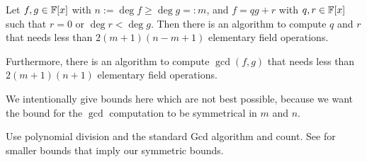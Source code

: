 


\begin{Prop}
\label{standardgcd}

Let $f,g \in \mathbb{F}[x]$ with $n := \deg f \ge \deg g =: m$, and $f = qg + r$
with $q,r \in \mathbb{F}[x]$ such that $r=0$ or $\deg r < \deg g$. Then there is an
algorithm to compute $q$ and $r$ that needs less than $2(m+1)(n-m+1)$ 
elementary field operations. 

Furthermore, there is an
algorithm to compute $\gcd(f,g)$ that needs less than
$2(m+1)(n+1)$ elementary field operations.
\end{Prop}

\begin{Rem}{We intentionally give bounds here which are not best possible,
because we want the bound for the $\gcd$ computation to be symmetrical in
$m$ and $n$.}
\end{Rem}

Use polynomial division and the standard {\sc Gcd} algorithm
and count. See \cite[Section 2.4 and Section 3.3]{vzG} for
smaller bounds that imply our symmetric bounds.
%
\proofend

